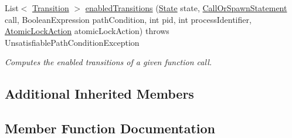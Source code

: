 \begin{DoxyCompactItemize}
\item 
List$<$ \hyperlink{interfaceedu_1_1udel_1_1cis_1_1vsl_1_1civl_1_1semantics_1_1IF_1_1Transition}{Transition} $>$ \hyperlink{classedu_1_1udel_1_1cis_1_1vsl_1_1civl_1_1library_1_1domain_1_1LibdomainEnabler_ab1d4bee1c22452e5de7ee3615202d5dd}{enabled\+Transitions} (\hyperlink{interfaceedu_1_1udel_1_1cis_1_1vsl_1_1civl_1_1state_1_1IF_1_1State}{State} state, \hyperlink{interfaceedu_1_1udel_1_1cis_1_1vsl_1_1civl_1_1model_1_1IF_1_1statement_1_1CallOrSpawnStatement}{Call\+Or\+Spawn\+Statement} call, Boolean\+Expression path\+Condition, int pid, int process\+Identifier, \hyperlink{enumedu_1_1udel_1_1cis_1_1vsl_1_1civl_1_1semantics_1_1IF_1_1Transition_1_1AtomicLockAction}{Atomic\+Lock\+Action} atomic\+Lock\+Action)  throws Unsatisfiable\+Path\+Condition\+Exception 
\begin{DoxyCompactList}\small\item\em Computes the enabled transitions of a given function call. \end{DoxyCompactList}\end{DoxyCompactItemize}
\subsection*{Additional Inherited Members}


\subsection{Member Function Documentation}
\hypertarget{classedu_1_1udel_1_1cis_1_1vsl_1_1civl_1_1library_1_1domain_1_1LibdomainEnabler_ab1d4bee1c22452e5de7ee3615202d5dd}{}
